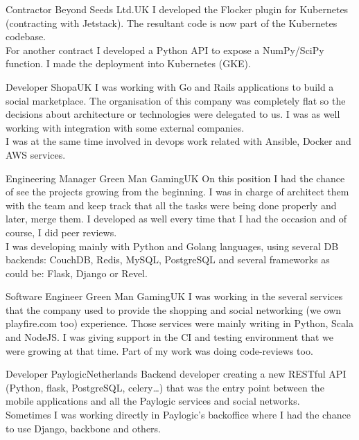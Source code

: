 \documentclass[11pt, a4paper, sans]{moderncv}
\begin{document}
{Contractor}
{Beyond Seeds Ltd.}{UK}{}
{I developed the Flocker plugin for Kubernetes (contracting with Jetstack). The resultant code is now part of the Kubernetes codebase.\\
For another contract I developed a Python API to expose a NumPy/SciPy function. I made the deployment into Kubernetes (GKE).\\}

{Developer}
{Shopa}{UK}{}
{I was working with Go and Rails applications to build a social marketplace. The
organisation of this company was completely flat so the decisions about
architecture or technologies were delegated to us. I was as well working with
integration with some external companies.\\I was at the same time involved in
devops work related with Ansible, Docker and AWS services.\\}

{Engineering Manager}
{Green Man Gaming}{UK}{}
{On this position I had the chance of see the projects growing from the
beginning. I was in charge of architect them with the team and keep track that
all the tasks were being done properly and later, merge them. I developed  as
well every time that I had the occasion and of course, I did peer reviews.\\I
was developing mainly with Python and Golang languages, using several DB
backends: CouchDB, Redis, MySQL, PostgreSQL and several frameworks as could be:
Flask, Django or Revel.\\}

{Software Engineer}
{Green Man Gaming}{UK}{}
{I was working in the several services that the company used to provide the
shopping and social networking (we own playfire.com too) experience. Those
services were mainly writing in Python, Scala and NodeJS. I was giving support
in the CI and testing environment that we were growing at that time. Part of my
work was doing code-reviews too.\\}

{Developer}
{Paylogic}{Netherlands}{}
{Backend developer creating a new RESTful API (Python, flask, PostgreSQL,
celery\ldots) that was the entry point between the mobile applications and all
the Paylogic services and social networks.\\Sometimes I was working directly in
Paylogic's backoffice where I had the chance to use Django, backbone and others.\\}
\end{document}
